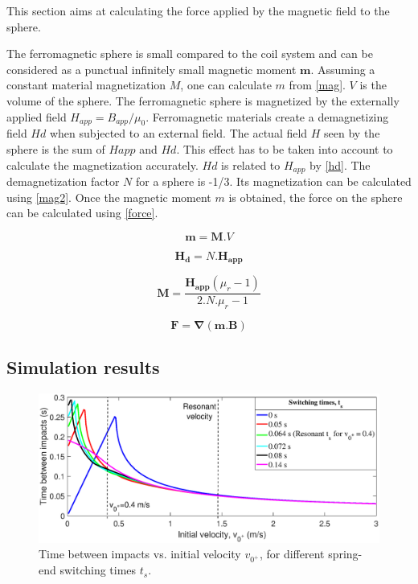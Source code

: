 \documentclass[letterpaper, 10 pt, conference]{ieeeconf}  %
\begin{document}
This section aims at calculating the force applied by the magnetic field to the sphere.\par
The ferromagnetic sphere is small compared to the coil system and can be considered as a punctual infinitely small magnetic moment $\mathbf{m}$. Assuming a constant material magnetization $M$, one can calculate $m$ from \ref{mag}. $V$ is the volume of the sphere.
The ferromagnetic sphere is magnetized by the externally applied field $H_{app}=B_{app}/\mu_0$. Ferromagnetic materials create a demagnetizing field $Hd$ when subjected to an external field. The actual field $H$ seen by the sphere is the sum of $Happ$ and $Hd$. This effect has to be taken into account to calculate the magnetization accurately. $Hd$ is related to $H_{app}$ by \ref{hd}. The demagnetization factor $N$ for a sphere is -1/3. Its magnetization can be calculated using \ref{mag2}.
Once the magnetic moment $m$ is obtained, the force on the sphere can be calculated using \ref{force}.

\begin{equation}
\mathbf{m}=\mathbf{M}.V
\label{mag}
\end{equation}

\begin{equation}
\mathbf{H_d}=N.\mathbf{H_{app}}
\label{hd}
\end{equation}

\begin{equation}
\mathbf{M}=\frac{\mathbf{H_{app}}\left ( \mu_r-1  \right )}{2.N.\mu_r-1}
\label{mag2}
\end{equation}

\begin{equation}
\mathbf{F}=\mathbf{\nabla}(\mathbf{m}.\mathbf{B})
\label{force}
\end{equation}

\subsection{Simulation results}

\begin{figure}
	\includegraphics[width=\linewidth]{delTvsVop_R3.eps}
	\caption{Time between impacts vs. initial velocity $v_{0^+}$, for different spring-end switching times $t_s$.}
	\label{delTvsVop}
\end{figure}
\end{document}
